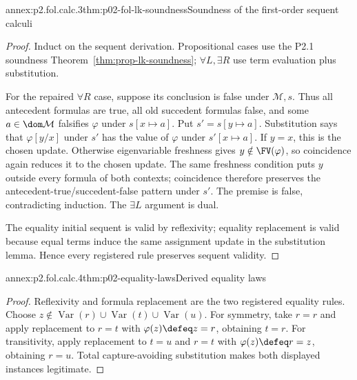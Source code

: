 \begin{annexitem}{annex:p2.fol.calc.3}{thm:p02-fol-lk-soundness}{Soundness of the first-order sequent calculi}
\begin{proof}
Induct on the sequent derivation.  Propositional cases use the P2.1 soundness
Theorem~\ref{thm:prop-lk-soundness}; \(\forall L,\exists R\) use term
evaluation plus substitution.

For the repaired \(\forall R\) case, suppose its conclusion is false under
\(\mathcal M,s\).  Thus all antecedent formulas are true, all old succedent
formulas false, and some \(a\in\dom\mathcal M\) falsifies \(\varphi\) under
\(s[x\mapsto a]\).  Put \(s'=s[y\mapsto a]\).  Substitution says that
\(\varphi[y/x]\) under \(s'\) has the value of \(\varphi\) under
\(s'[x\mapsto a]\).  If \(y=x\), this is the chosen update.  Otherwise
eigenvariable freshness gives \(y\notin\FV(\varphi)\), so coincidence again
reduces it to the chosen update.  The same freshness condition puts \(y\)
outside every formula of both contexts; coincidence therefore preserves the
antecedent-true/succedent-false pattern under \(s'\).  The premise is false,
contradicting induction.  The \(\exists L\) argument is dual.

The equality initial sequent is valid by reflexivity; equality replacement
is valid because equal terms induce the same assignment update in the
substitution lemma.  Hence every registered rule preserves sequent validity.
\end{proof}
\end{annexitem}

\begin{annexitem}{annex:p2.fol.calc.4}{thm:p02-equality-laws}{Derived equality laws}
\begin{proof}
Reflexivity and formula replacement are the two registered equality rules.
Choose \(z\notin
\operatorname{Var}(r)\cup\operatorname{Var}(t)\cup\operatorname{Var}(u)\).
For symmetry, take \(r=r\) and apply replacement to \(r=t\) with
\(\varphi(z)\defeq z=r\), obtaining \(t=r\).  For transitivity, apply
replacement to \(t=u\) and \(r=t\) with
\(\varphi(z)\defeq r=z\), obtaining \(r=u\).  Total capture-avoiding
substitution makes both displayed instances legitimate.
\end{proof}
\end{annexitem}

